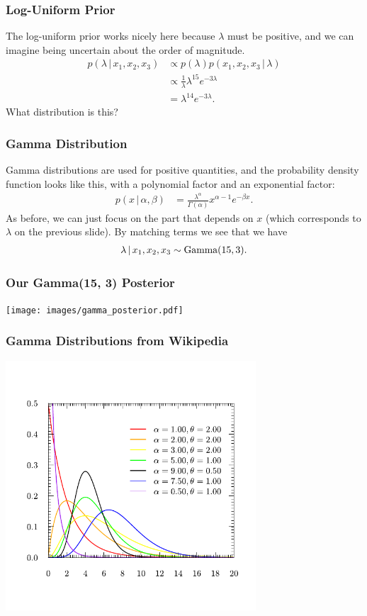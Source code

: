\documentclass{beamer}
\newcommand{\given}{\,|\,}
\begin{document}
\begin{frame}
\frametitle{Log-Uniform Prior}
The log-uniform prior works nicely here because $\lambda$ must be positive,
and we can imagine being uncertain about the order of magnitude.\pause
\begin{align}
p(\lambda \given x_1, x_2, x_3) &\propto p(\lambda)p(x_1, x_2, x_3 \given \lambda) \\
    &\propto \frac{1}{\lambda} \lambda^{15}e^{-3\lambda} \\
    &= \lambda^{14}e^{-3\lambda}.
\end{align}
\pause
What distribution is this?

\end{frame}


\begin{frame}
\frametitle{Gamma Distribution}
Gamma distributions are used for positive quantities, and the
probability density function looks like this, with a polynomial factor
and an exponential factor:
\begin{align}
p(x \given \alpha, \beta)
    &= \frac{\lambda^{\alpha}}{\Gamma(\alpha)}
            x^{\alpha-1}e^{-\beta x}.
\end{align}
\pause
As before, we can just focus on the part that depends on $x$ (which corresponds
to $\lambda$ on the previous slide). By matching terms we see that we have
\begin{align}
\lambda \given x_1, x_2, x_3 \sim \textnormal{Gamma}(15, 3).
\end{align}

\end{frame}


\begin{frame}
\frametitle{Our Gamma(15, 3) Posterior}

\centering
\texttt{[image: images/gamma\_posterior.pdf]}

\end{frame}


\begin{frame}
\frametitle{Gamma Distributions from Wikipedia}
\centering
\includegraphics[width=0.7\textwidth]{images/gammas.pdf}

\end{frame}
\end{document}
